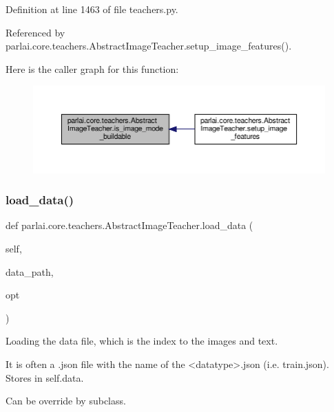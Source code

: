 Definition at line 1463 of file teachers.\+py.



Referenced by parlai.\+core.\+teachers.\+Abstract\+Image\+Teacher.\+setup\+\_\+image\+\_\+features().

Here is the caller graph for this function\+:
\nopagebreak
\begin{figure}[H]
\begin{center}
\leavevmode
\includegraphics[width=350pt]{classparlai_1_1core_1_1teachers_1_1AbstractImageTeacher_a16c2be0ffe61e136dea2a63cbd918af5_icgraph}
\end{center}
\end{figure}
\mbox{\label{classparlai_1_1core_1_1teachers_1_1AbstractImageTeacher_ad110a80a077e9e1135d4241083786199}} 
\subsubsection{\texorpdfstring{load\+\_\+data()}{load\_data()}}
{\footnotesize\ttfamily def parlai.\+core.\+teachers.\+Abstract\+Image\+Teacher.\+load\+\_\+data (\begin{DoxyParamCaption}\item[{}]{self,  }\item[{}]{data\+\_\+path,  }\item[{}]{opt }\end{DoxyParamCaption})}

\begin{DoxyVerb}Loading the data file, which is the index to the images and text.

It is often a .json file with the name of the <datatype>.json (i.e.
train.json). Stores in self.data.

Can be override by subclass.
\end{DoxyVerb}
 

